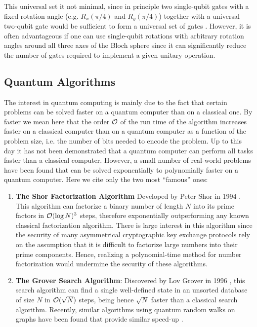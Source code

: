 This universal set it not minimal, since in principle two single-qubit gates with a fixed rotation angle (e.g. $R_x(\pi/4)$ and $R_y(\pi/4)$) together with a universal two-qubit gate would be sufficient to form a universal set of gates \citep{dawson_solovay-kitaev_2005}. However, it is often advantageous if one can use single-qubit rotations with arbitrary rotation angles around all three axes of the Bloch sphere since it can significantly reduce the number of gates required to implement a given unitary operation.

\subsection{Quantum Algorithms}

The interest in quantum computing is mainly due to the fact that certain problems can be solved faster on a quantum computer than on a classical one. By faster we mean here that the order $\cal{O}$ of the run time of the algorithm increases faster on a classical computer than on a quantum computer as a function of the problem size, i.e. the number of bits needed to encode the problem. Up to this day it has not been demonstrated that a quantum computer can perform all tasks faster than a classical computer. However, a small number of real-world problems have been found that can be solved exponentially to polynomially faster on a quantum computer. Here we cite only the two most ``famous'' ones:

\begin{enumerate}
\item \textbf{The Shor Factorization Algorithm} Developed by Peter Shor in 1994 \citep{shor_algorithms_1994,shor_polynomial-time_1995}. This algorithm can factorize a binary number of length $N$ into its prime factors in $\begin{mathcal}O\end{mathcal}(\log{N})^3$ steps, therefore exponentially outperforming any known classical factorization algorithm. There is large interest in this algorithm since the security of many asymmetrical cryptographic key exchange protocols rely on the assumption that it is difficult to factorize large numbers into their prime components. Hence, realizing a polynomial-time method for number factorization would undermine the security of these algorithms.
\item \textbf{The Grover Search Algorithm}: Discovered by Lov Grover in 1996 \citep{grover_fast_1996}, this search algorithm can find a single well-defined state in an unsorted database of size $N$ in $\begin{mathcal}O\end{mathcal}(\sqrt{N})$ steps, being hence $\sqrt{N}$ faster than a classical search algorithm. Recently, similar algorithms using quantum random walks on graphs have been found that provide similar speed-up \citep{shenvi_quantum_2003}.
\end{enumerate}


